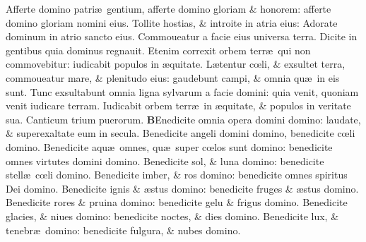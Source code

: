 \documentclass[a5paper,10pt]{book}
\def\ae{æ}
\def\oe{œ}
\begin{document}
\begin{multicols*}{2}
\newline \color{red} A\color{black}fferte domino patri\ae \ gentium, afferte domino gloriam \& honorem: afferte domino gloriam nomini eius.
\newline \color{red} T\color{black}ollite hostias, \& introite in atria eius: Adorate dominum in atrio sancto eius.
\newline \color{red} C\color{black}ommoueatur a facie eius universa terra. Dicite in gentibus quia dominus regnauit.
\newline \color{red} E\color{black}tenim correxit orbem terr\ae \ qui non commovebitur: iudicabit populos in \ae quitate.
\newline \color{red} L\color{black}\ae tentur c\oe li, \& exsultet terra, commoueatur mare, \& plenitudo eius: gaudebunt campi, \& omnia qu\ae \ in eis sunt.
\newline \color{red} T\color{black}unc exsultabunt omnia ligna sylvarum a facie domini: quia venit, quoniam venit iudicare terram.
\newline \color{red} I\color{black}udicabit orbem terr\ae \ in \ae quitate, \& populos in veritate sua.
\newline \color{red} Canticum trium puerorum. \color{black}
\vspace{-1em}
\lettrine[lines=2]{\bfseries \color{red} B}{}Enedicite omnia opera domini domino: laudate, \& superexaltate eum in secula.
\newline \color{red} B\color{black}enedicite angeli domini domino, benedicite c\oe li domino.
\newline \color{red} B\color{black}enedicite aqu\ae \ omnes, qu\ae \ super c\oe los sunt domino: benedicite omnes virtutes domini domino.
\newline \color{red} B\color{black}enedicite sol, \& luna domino: benedicite stell\ae \ c\oe li domino.
\newline \color{red} B\color{black}enedicite imber, \& ros domino: benedicite omnes spiritus Dei domino.
\newline \color{red} B\color{black}enedicite ignis \& \ae stus domino: benedicite fruges \& \ae stus domino.
\newline \color{red} B\color{black}enedicite rores \& pruina domino: benedicite gelu \& frigus domino.
\newline \color{red} B\color{black}enedicite glacies, \& niues domino: benedicite noctes, \& dies domino.
\newline \color{red} B\color{black}enedicite lux, \& tenebr\ae \ domino: benedicite fulgura, \& nubes domino.

\end{multicols*}
\end{document}
